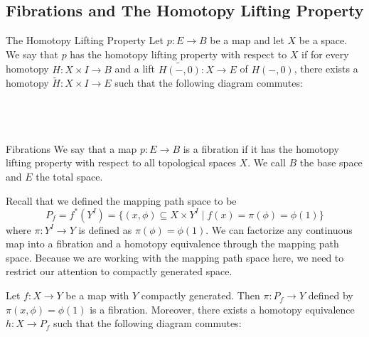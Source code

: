 \documentclass[a4paper]{article}
\begin{document}
\subsection{Fibrations and The Homotopy Lifting Property}
\begin{defn}{The Homotopy Lifting Property}{} Let $p:E\to B$ be a map and let $X$ be a space. We say that $p$ has the homotopy lifting property with respect to $X$ if for every homotopy $H:X\times I\to B$ and a lift $\widetilde{H(-,0)}:X\to E$ of $H(-,0)$, there exists a homotopy $\widetilde{H}:X\times I\to E$ such that the following diagram commutes: \\~\\
\\~\\
\end{defn}

\begin{defn}{Fibrations}{} We say that a map $p:E\to B$ is a fibration if it has the homotopy lifting property with respect to all topological spaces $X$. We call $B$ the base space and $E$ the total space. 
\end{defn}

Recall that we defined the mapping path space to be $$P_f=f^\ast(Y^I)=\{(x,\phi)\subseteq X\times Y^I\;|\;f(x)=\pi(\phi)=\phi(1)\}$$ where $\pi:Y^I\to Y$ is defined as $\pi(\phi)=\phi(1)$. We can factorize any continuous map into a fibration and a homotopy equivalence through the mapping path space. Because we are working with the mapping path space here, we need to restrict our attention to compactly generated space. 

\begin{thm}{}{} Let $f:X\to Y$ be a map with $Y$ compactly generated. Then $\pi:P_f\to Y$ defined by $\pi(x,\phi)=\phi(1)$ is a fibration. Moreover, there exists a homotopy equivalence $h:X\to P_f$ such that the following diagram commutes: \\~\\
\end{thm}
\end{document}
